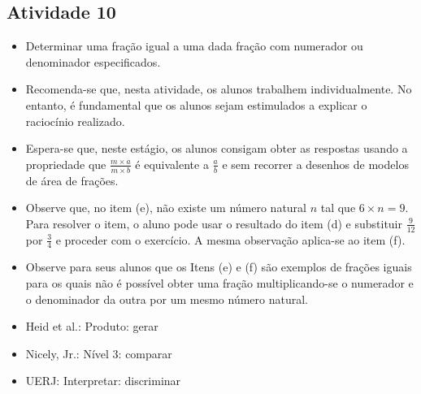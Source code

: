 \begin{multicols}{2}
\subsection{Atividade 10}

\begin{itemize} %
    \item       Determinar uma fração igual a uma dada fração com numerador ou
denominador especificados.
\end{itemize} %

\begin{itemize} %
    \item       Recomenda-se que, nesta atividade, os alunos trabalhem
individualmente. No entanto, é fundamental que os alunos sejam estimulados a
explicar o raciocínio realizado.
    \item       Espera-se que, neste estágio, os alunos consigam obter as
respostas usando a propriedade que       $\frac{m \times a}{m \times b}$       é
equivalente a       $\frac{a}{b}$       e sem recorrer a desenhos de modelos de
área de frações.
    \item       Observe que, no item (e), não existe um número natural       $n$
      tal que       $6 \times n = 9$. Para resolver o item, o aluno pode usar o
resultado do item (d) e substituir       $\frac{9}{12}$       por
$\frac{3}{4}$       e proceder com o exercício. A mesma observação aplica-se ao
item (f).
    \item       Observe para seus alunos que os Itens (e) e (f) são exemplos de
frações iguais para os quais não é possível obter uma fração multiplicando-se o
numerador e o denominador da outra por um mesmo número natural.
\end{itemize} %


   \vspace{.1cm}

 \vspace{.1cm}

\begin{itemize} %
    \item       Heid et al.: Produto: gerar
    \item       Nicely, Jr.: Nível 3: comparar
    \item       UERJ: Interpretar: discriminar
\end{itemize} %



\end{multicols}
